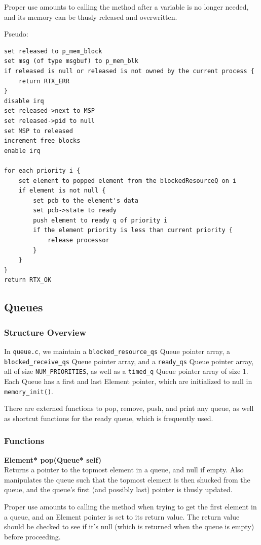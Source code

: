 \documentclass[11pt, oneside]{article}
\begin{document}
Proper use amounts to calling the method after a variable is no longer needed, and its memory can be thusly released and overwritten.

Pseudo:
\begin{verbatim}
set released to p_mem_block
set msg (of type msgbuf) to p_mem_blk
if released is null or released is not owned by the current process {
    return RTX_ERR
}
disable irq
set released->next to MSP
set released->pid to null
set MSP to released
increment free_blocks
enable irq

for each priority i {
    set element to popped element from the blockedResourceQ on i
    if element is not null {
        set pcb to the element's data
        set pcb->state to ready
        push element to ready q of priority i
        if the element priority is less than current priority {
            release processor
        }
    }
}
return RTX_OK
\end{verbatim}


\subsection{Queues}
\subsubsection{Structure Overview}
In {\tt queue.c}, we maintain a {\tt blocked\_resource\_qs} Queue pointer array, a {\tt blocked\_receive\_qs} Queue pointer array, and a {\tt ready\_qs} Queue pointer array, all of size {\tt NUM\_PRIORITIES}, as well as a {\tt timed\_q} Queue pointer array of size 1. Each Queue has a first and last Element pointer, which are initialized to null in {\tt memory\_init()}.

There are externed functions to pop, remove, push, and print any queue, as well as shortcut functions for the ready queue, which is frequently used.

\subsubsection{Functions}
{\bf Element* pop(Queue* self)}\\
Returns a pointer to the topmost element in a queue, and null if empty. Also manipulates the queue such that the topmost element is then shucked from the queue, and the queue's first (and possibly last) pointer is thusly updated.

Proper use amounts to calling the method when trying to get the first element in a queue, and an Element pointer is set to its return value. The return value should be checked to see if it's null (which is returned when the queue is empty) before proceeding.
\end{document}

